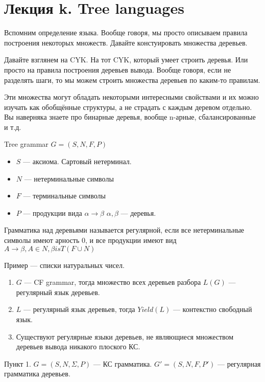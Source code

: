 \section{Лекция k. Tree languages}

Вспомним определение языка. Вообще говоря, мы просто описываем правила построения некоторых множеств. Давайте констуировать множества деревьев.

Давайте взглянем на CYK. На тот CYK, который умеет строить деревья. Или просто на правила построения деревьев вывода. Вообще говоря, если не разделять шаги, то мы можем строить множества деревьев по каким-то правилам.

Эти множества могут обладать некоторыми интересными свойствами и их можно изучать как обобщённые структуры, а не страдать с каждым деревом отдельно. Вы наверняка знаете про бинарные деревья, вообще n-арные, сбалансированные и т.д.
\begin{mydef}
Tree grammar $G=(S,N,F,P)$
\begin{itemize}
\item $S$ --- аксиома. Сартовый нетерминал.
\item $N$ --- нетерминальные символы
\item $F$ --- терминальные символы
\item $P$ --- продукции вида $ \alpha \rightarrow \beta $ $\alpha, \beta$ --- деревья.
\end{itemize}
\end{mydef}

Грамматика над деревьями называется регулярной, если все нетерминальные символы имеют арность 0, и все продукции имеют вид $A \rightarrow \beta, A \in N, \beta is T(F \cup N)$


Пример --- списки натуральных чисел.


\begin{mytheorem}
\begin{enumerate}
\item $G$ --- CF grammar, тогда множество всех деревьев разбора $L(G)$ --- регулярный язык деревьев.
\item $L$ --- регулярный язык деревьев, тогда $Yield(L)$ --- контекстно свободный язык.
\item Существуют регулярные языки деревьев, не являющиеся множеством деревьев вывода никакого плоского КС.
\end{enumerate}
\end{mytheorem}

Пункт 1. $G=(S,N,\Sigma,P)$ --- КС грамматика. $G'=(S,N,F,P')$ --- регулярная грамматика деревьев.

